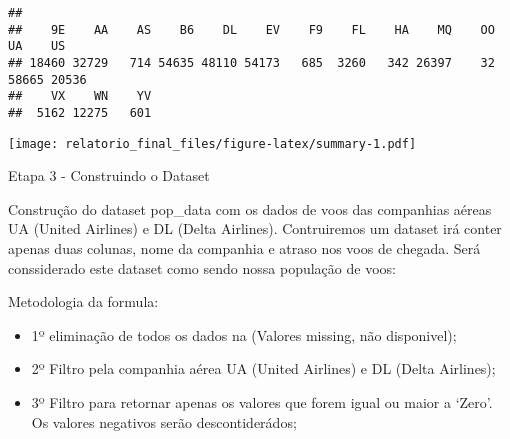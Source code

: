 \documentclass[]{article}
\newenvironment{Shaded}{\begin{snugshade}}{\end{snugshade}}
\newcommand{\CommentTok}[1]{\textcolor[rgb]{0.56,0.35,0.01}{\textit{#1}}}
\newcommand{\DataTypeTok}[1]{\textcolor[rgb]{0.13,0.29,0.53}{#1}}
\newcommand{\DecValTok}[1]{\textcolor[rgb]{0.00,0.00,0.81}{#1}}
\newcommand{\KeywordTok}[1]{\textcolor[rgb]{0.13,0.29,0.53}{\textbf{#1}}}
\newcommand{\NormalTok}[1]{#1}
\newcommand{\OperatorTok}[1]{\textcolor[rgb]{0.81,0.36,0.00}{\textbf{#1}}}
\newcommand{\StringTok}[1]{\textcolor[rgb]{0.31,0.60,0.02}{#1}}
\begin{document}
\begin{verbatim}
## 
##    9E    AA    AS    B6    DL    EV    F9    FL    HA    MQ    OO    UA    US 
## 18460 32729   714 54635 48110 54173   685  3260   342 26397    32 58665 20536 
##    VX    WN    YV 
##  5162 12275   601
\end{verbatim}

\begin{Shaded}
\end{Shaded}

\texttt{[image: relatorio\_final\_files/figure-latex/summary-1.pdf]}

Etapa 3 - Construindo o Dataset

Construção do dataset pop\_data com os dados de voos das companhias
aéreas UA (United Airlines) e DL (Delta Airlines). Contruiremos um
dataset irá conter apenas duas colunas, nome da companhia e atraso nos
voos de chegada. Será conssiderado este dataset como sendo nossa
população de voos:

Metodologia da formula:

\begin{itemize}
\item
  1º eliminação de todos os dados na (Valores missing, não disponivel);
\item
  2º Filtro pela companhia aérea UA (United Airlines) e DL (Delta
  Airlines);
\item
  3º Filtro para retornar apenas os valores que forem igual ou maior a
  `Zero'. Os valores negativos serão descontiderádos;
\end{itemize}

\begin{Shaded}
\end{Shaded}
\end{document}
